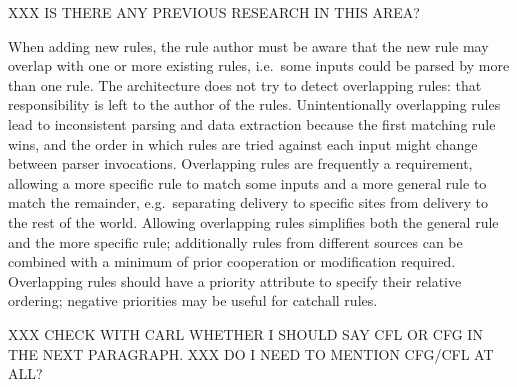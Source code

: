 \label{overlapping rules in architecture}

XXX IS THERE ANY PREVIOUS RESEARCH IN THIS AREA\@?

When adding new rules, the rule author must be aware that the new rule may
overlap with one or more existing rules, i.e.\ some inputs could be parsed
by more than one rule.  The architecture does not try to detect overlapping
rules: that responsibility is left to the author of the rules.
Unintentionally overlapping rules lead to inconsistent parsing and data
extraction because the first matching rule wins, and the order in which
rules are tried against each input might change between parser invocations.
Overlapping rules are frequently a requirement, allowing a more specific
rule to match some inputs and a more general rule to match the remainder,
e.g.\ separating  delivery to specific sites from
 delivery to the rest of the world.  Allowing overlapping
rules simplifies both the general rule and the more specific rule;
additionally rules from different sources can be combined with a minimum of
prior cooperation or modification required.  Overlapping rules should have
a priority attribute to specify their relative ordering; negative
priorities may be useful for catchall rules.

XXX CHECK WITH CARL WHETHER I SHOULD SAY CFL OR CFG IN THE NEXT
PARAGRAPH\@.  XXX DO I NEED TO MENTION CFG/CFL AT ALL\@?

